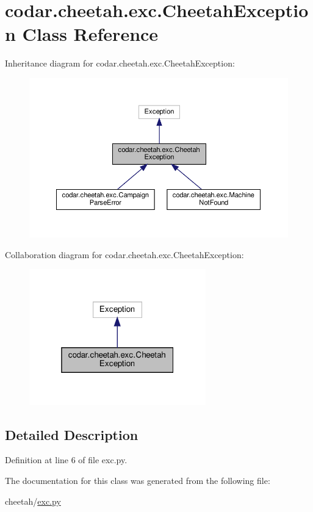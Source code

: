 \hypertarget{classcodar_1_1cheetah_1_1exc_1_1_cheetah_exception}{}\section{codar.\+cheetah.\+exc.\+Cheetah\+Exception Class Reference}
\label{classcodar_1_1cheetah_1_1exc_1_1_cheetah_exception}


Inheritance diagram for codar.\+cheetah.\+exc.\+Cheetah\+Exception\+:
\nopagebreak
\begin{figure}[H]
\begin{center}
\leavevmode
\includegraphics[width=350pt]{classcodar_1_1cheetah_1_1exc_1_1_cheetah_exception__inherit__graph}
\end{center}
\end{figure}


Collaboration diagram for codar.\+cheetah.\+exc.\+Cheetah\+Exception\+:
\nopagebreak
\begin{figure}[H]
\begin{center}
\leavevmode
\includegraphics[width=217pt]{classcodar_1_1cheetah_1_1exc_1_1_cheetah_exception__coll__graph}
\end{center}
\end{figure}


\subsection{Detailed Description}


Definition at line 6 of file exc.\+py.



The documentation for this class was generated from the following file\+:\begin{DoxyCompactItemize}
\item 
cheetah/\hyperlink{cheetah_2exc_8py}{exc.\+py}\end{DoxyCompactItemize}
